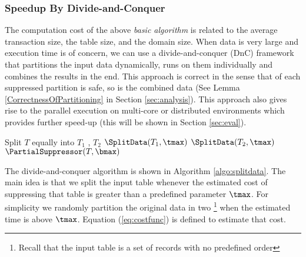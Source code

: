 \subsubsection{Speedup By Divide-and-Conquer}
\label{subsec:speedup}
The computation cost of the above {\em basic algorithm} is related to 
the average transaction size, the table size, and the domain size. 
When data is very large and execution time is of concern, 
we can use a divide-and-conquer (DnC)
framework that partitions the input data dynamically, runs \PartialSuppressor
on them individually and combines the results in the end. This approach is
correct in the sense that of each suppressed partition is safe, so is the
combined data (See Lemma \ref{CorrectnessOfPartitioning} in Section
\ref{sec:analysis}). This approach also gives rise to the parallel execution
on multi-core or distributed environments which provides further speed-up
(this will be shown in Section \ref{sec:eval}).

\begin{algorithm}
\caption{$\SplitData(T,\tmax)$} \label{algo:splitdata}
\begin{algorithmic}[1]
        \STATE Split $T$ equally into $T_1$ , $T_2$
        \STATE $\SplitData(T_1,  \tmax)$
        \STATE $\SplitData(T_2, \tmax)$
    \ELSE
        \STATE $\PartialSuppressor(T,  \bmax)$
    \ENDIF
\end{algorithmic}
\end{algorithm}

The divide-and-conquer algorithm is shown in Algorithm \ref{algo:splitdata}.
The main idea is that we split the input table whenever the estimated cost of
suppressing that table is greater than a predefined parameter $\tmax$. 
For simplicity we randomly partition the original data in two 
\footnote{Recall that the input table is a set of records with 
no predefined order} when the estimated time is above $\tmax$.
Equation (\ref{eq:costfunc}) is defined to estimate that cost.

